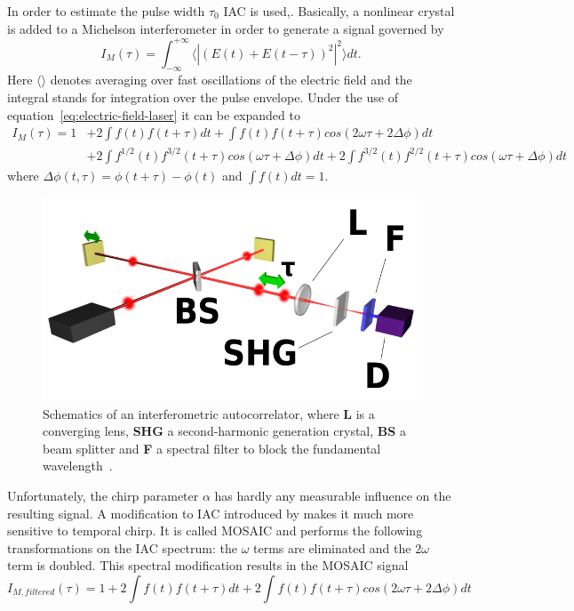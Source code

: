 In order to estimate the pulse width $\tau_0$ \ac{IAC} is used,.
Basically, a nonlinear crystal is added to a Michelson interferometer in order to generate a signal governed by
\begin{equation}
I_M(\tau) = \int_{-\infty}^{+\infty}\langle|(E(t)+E(t-\tau))^2|^2\rangle dt.
\end{equation}
Here $\langle \rangle$ denotes averaging over fast oscillations of the electric field and the integral stands for integration over the pulse envelope.
Under the use of equation~\ref{eq:electric-field-laser} it can be expanded to
\begin{align}
I_M(\tau) = 1 &+ 2 \int f(t) f(t + \tau) dt + \int f(t) f(t + \tau) cos(2 \omega \tau + 2 \Delta \phi) dt \nonumber\\
&+ 2 \int f^{1/2}(t) f^{3/2}(t + \tau) cos(\omega \tau + \Delta \phi) dt + 2 \int f^{3/2}(t) f^{2/2}(t + \tau) cos(\omega \tau + \Delta \phi) dt
\end{align}
where $\Delta \phi(t, \tau) = \phi(t + \tau) - \phi(t)$ and $\int f(t) dt = 1$.
\begin{figure}[H]
	\centering
	\includegraphics[width=0.8\linewidth]{figures/chirp/Optical-interferometric-autocorrelation-setup.png}
	\caption{Schematics of an interferometric autocorrelator, where \textbf{L} is a converging lens, \textbf{SHG} a second-harmonic generation crystal, \textbf{BS} a beam splitter and \textbf{F} a spectral filter to block the fundamental wavelength~\cite{noauthor_optical_nodate}.}
	\label{fig:optical-field-autocorrelation-setup}
\end{figure}
Unfortunately, the chirp parameter $\alpha$ has hardly any measurable influence on the resulting signal.
A modification to \ac{IAC} introduced by \textcite{hirayama_real-time_2002} makes it much more sensitive to temporal chirp.
It is called \ac{MOSAIC} and performs the following transformations on the \ac{IAC} spectrum: the $\omega$ terms are eliminated and the $2\omega$ term is doubled.
This spectral modification results in the \ac{MOSAIC} signal
\begin{equation}
I_{M, filtered}(\tau) = 1 + 2 \int f(t) f(t + \tau) dt + 2 \int f(t) f(t + \tau) cos(2\omega \tau + 2\Delta \phi) dt
\end{equation}

